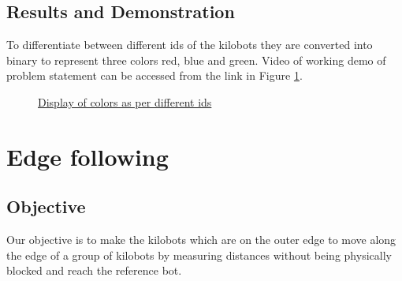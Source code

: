\documentclass{report}[12pt]
\begin{document}
\section{Results and Demonstration}
To differentiate between different ids of the kilobots they are converted into binary to represent three colors red, blue and green. 
Video of working demo of problem statement can be accessed from the link in Figure \ref{fig:gradient-color}.

\begin{figure}[H]
	\centering
	\caption{\href{https://drive.google.com/drive/folders/14PzarH4uEqTsYBiknOU7pAX3xXhWmLxa}{Display of colors as per different ids}}
	\label{fig:gradient-color}
\end{figure}

\chapter{Edge following}

\section{Objective}
Our objective is to make the kilobots which are on the outer edge to move along the edge of a group of kilobots by measuring distances without being physically blocked and reach the reference bot. 
\end{document}
